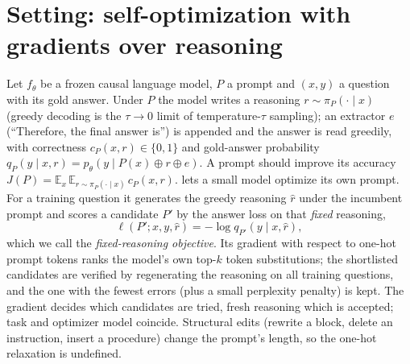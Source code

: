 \section{Setting: self-optimization with gradients over reasoning}
\label{sec:background}

Let $f_\theta$ be a frozen causal language model, $P$ a prompt and $(x,y)$ a question with its gold
answer. Under $P$ the model writes a reasoning $r\sim\pi_P(\cdot\mid x)$ (greedy decoding is the
$\tau\!\to\!0$ limit of temperature-$\tau$ sampling); an extractor $e$ (``Therefore, the final
answer is'') is appended and the answer is read greedily, with correctness $c_P(x,r)\in\{0,1\}$ and
gold-answer probability $q_P(y\mid x,r)=p_\theta(y\mid P(x)\oplus r\oplus e)$. A prompt should
improve its accuracy $J(P)=\mathbb{E}_{x}\,\mathbb{E}_{r\sim\pi_P(\cdot\mid x)}\,c_P(x,r)$.
\greater{} \citep{das2025greater} lets a small model optimize its own prompt. For a training
question it generates the greedy reasoning $\hat r$ under the incumbent prompt and scores a
candidate $P'$ by the answer loss on that \emph{fixed} reasoning,
\begin{equation}
\ell(P';x,y,\hat r)=-\log q_{P'}(y\mid x,\hat r),
\label{eq:greater}
\end{equation}
which we call the \emph{fixed-reasoning objective}. Its gradient with respect to one-hot prompt
tokens ranks the model's own top-$k$ token substitutions; the shortlisted candidates are verified by
regenerating the reasoning on all training questions, and the one with the fewest errors (plus a
small perplexity penalty) is kept. The gradient decides which candidates are tried, fresh reasoning
which is accepted; task and optimizer model coincide. Structural edits (rewrite a block, delete an
instruction, insert a procedure) change the prompt's length, so the one-hot relaxation is undefined.

